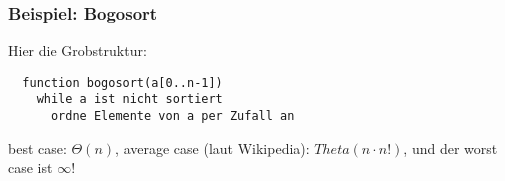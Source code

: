 \begin{frame}[fragile]
\frametitle{Beispiel: Bogosort}
Hier die Grobstruktur:
\begin{lstlisting}
  function bogosort(a[0..n-1])
    while a ist nicht sortiert
      ordne Elemente von a per Zufall an
\end{lstlisting}\pause
best case: $\Theta(n)$, average case (laut Wikipedia): $Theta(n\cdot n!)$, und der worst case ist $\infty$!
\end{frame} 
